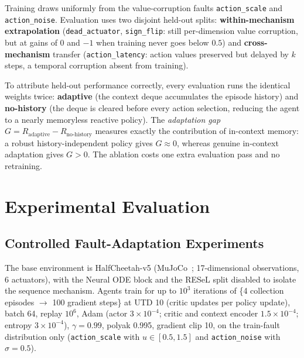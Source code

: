 \documentclass[conference]{IEEEtran}
\begin{document}
Training draws uniformly from the value-corruption faults \texttt{action\_scale} and \texttt{action\_noise}. Evaluation uses two disjoint held-out splits: \textbf{within-mechanism extrapolation} (\texttt{dead\_actuator}, \texttt{sign\_flip}: still per-dimension value corruption, but at gains of $0$ and $-1$ when training never goes below $0.5$) and \textbf{cross-mechanism} transfer (\texttt{action\_latency}: action values preserved but delayed by $k$ steps, a temporal corruption absent from training).

To attribute held-out performance correctly, every evaluation runs the identical weights twice: \textbf{adaptive} (the context deque accumulates the episode history) and \textbf{no-history} (the deque is cleared before every action selection, reducing the agent to a nearly memoryless reactive policy). The \emph{adaptation gap} $G = R_{\text{adaptive}} - R_{\text{no-history}}$ measures exactly the contribution of in-context memory: a robust history-independent policy gives $G \approx 0$, whereas genuine in-context adaptation gives $G > 0$. The ablation costs one extra evaluation pass and no retraining.

\section{Experimental Evaluation}
\label{sec:experiments}

\subsection{Controlled Fault-Adaptation Experiments}
\label{sec:fault_exp}
The base environment is HalfCheetah-v5 (MuJoCo~\cite{mujoco}; 17-dimensional observations, 6 actuators), with the Neural ODE block and the RESeL split disabled to isolate the sequence mechanism. Agents train for up to $10^3$ iterations of \{4 collection episodes $\rightarrow$ 100 gradient steps\} at UTD 10 (critic updates per policy update), batch 64, replay $10^6$, Adam (actor $3{\times}10^{-4}$; critic and context encoder $1.5{\times}10^{-4}$; entropy $3{\times}10^{-4}$), $\gamma = 0.99$, polyak 0.995, gradient clip 10, on the train-fault distribution only (\texttt{action\_scale} with $u \in [0.5, 1.5]$ and \texttt{action\_noise} with $\sigma = 0.5$).
\end{document}
